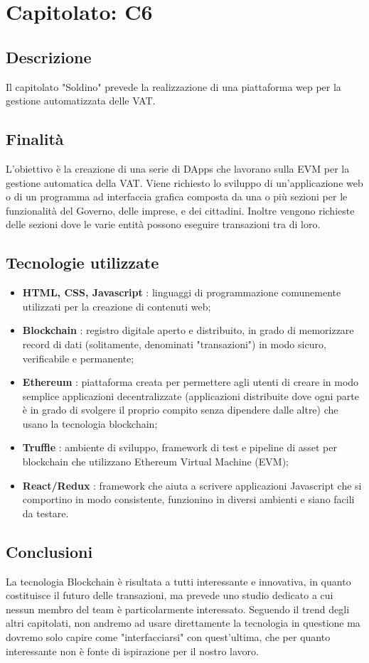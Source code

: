 \section{Capitolato: C6}
	\subsection{Descrizione}
		Il capitolato "Soldino" prevede la realizzazione di una piattaforma wep per la gestione automatizzata delle VAT.
	\subsection{Finalità}
		L'obiettivo è la creazione di una serie di DApps che lavorano sulla EVM per la gestione automatica della VAT.
		Viene richiesto lo sviluppo di un'applicazione web o di un programma ad interfaccia grafica composta da una o più sezioni per le funzionalità del Governo, delle imprese, e dei cittadini. Inoltre vengono richieste delle sezioni dove le varie entità possono eseguire transazioni tra di loro.
	\subsection{Tecnologie utilizzate}
		\begin{itemize}
			\item \textbf{HTML, CSS, Javascript} : linguaggi di programmazione comunemente utilizzati per la creazione di contenuti web;
			\item \textbf{Blockchain} : registro digitale aperto e distribuito, in grado di memorizzare record di dati (solitamente, denominati "transazioni") in modo sicuro, verificabile e permanente;
			\item \textbf{Ethereum} : piattaforma creata per permettere agli utenti di creare in modo semplice applicazioni decentralizzate (applicazioni distribuite dove ogni parte è in grado di svolgere il proprio compito senza dipendere dalle altre) che usano la tecnologia blockchain;
			\item \textbf{Truffle} : ambiente di sviluppo, framework di test e pipeline di asset per blockchain che utilizzano Ethereum Virtual Machine (EVM);
			\item \textbf{React/Redux} : framework che aiuta a scrivere applicazioni Javascript che si comportino in modo consistente, funzionino in diversi ambienti e siano facili da testare.
		\end{itemize}
	\subsection{Conclusioni}
		La tecnologia Blockchain è risultata a tutti interessante e innovativa, in quanto costituisce il futuro delle transazioni, ma prevede uno studio dedicato a cui nessun membro del team è particolarmente interessato. Seguendo il trend degli altri capitolati, non andremo ad usare direttamente la tecnologia in questione ma dovremo solo capire come "interfacciarsi" con quest'ultima, che per quanto interessante non è fonte di ispirazione per il nostro lavoro.
